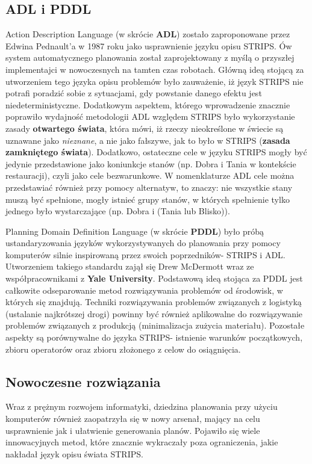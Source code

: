     \subsection{ADL i PDDL}
    Action Description Language (w skrócie \textbf{ADL}) zostało zaproponowane przez Edwina Pednault'a  w 1987 roku jako usprawnienie 
    języku opisu STRIPS. Ów system automatycznego planowania został zaprojektowany z myślą o przyszłej implementajci w nowoczesnych na tamten czas robotach.
    Główną ideą stojącą za utworzeniem tego języka opisu problemów było zauważenie, iż język STRIPS nie potrafi poradzić sobie z sytuacjami, gdy
    powstanie danego efektu jest niedeterministyczne. Dodatkowym aspektem, którego wprowadzenie znacznie poprawiło wydajność metodologii ADL względem STRIPS 
    było wykorzystanie zasady \textbf{otwartego świata}, która mówi, iż rzeczy nieokreślone w świecie są uznawane jako \textit{nieznane}, a nie jako 
    fałszywe, jak to było w STRIPS (\textbf{zasada zamkniętego świata}). Dodatkowo, ostateczne cele w języku STRIPS mogły być jedynie przedstawione jako 
    koniunkcje stanów (np. Dobra i Tania w kontekście restauracji), czyli jako cele bezwarunkowe. 
    W nomenklaturze ADL cele można przedstawiać również przy pomocy alternatyw, to znaczy: 
    nie wszystkie stany muszą być spełnione, mogły istnieć grupy stanów, w których spełnienie tylko jednego było wystarczające (np. Dobra i (Tania lub Blisko)). 

    Planning Domain Definition Language (w skrócie \textbf{PDDL}) było próbą ustandaryzowania języków wykorzystywanych 
    do planowania przy pomocy komputerów silnie inspirowaną przez swoich poprzedników- STRIPS i ADL. 
    Utworzeniem takiego standardu zajął się Drew McDermott wraz ze współpracownikami z \textbf{Yale University}.
    Podstawową ideą stojąca za PDDL jest całkowite odseparowanie metod rozwiązywania problemów od środowisk, w których się 
    znajdują. Techniki rozwiązywania problemów związanych z logistyką (ustalanie najkrótszej drogi) powinny być również aplikowalne do rozwiązywanie problemów 
    związanych z produkcją (minimalizacja zużycia materiału). Pozostałe aspekty są porównywalne do języka STRIPS- 
    istnienie warunków początkowych, zbioru operatorów oraz zbioru złożonego z celow do osiągnięcia.



    \subsection{Nowoczesne rozwiązania}
    Wraz z prężnym rozwojem informatyki, dziedzina planowania przy użyciu komputerów również zaopatrzyła się 
    w nowy arsenał, mający na celu usprawnienie jak i ułatwienie generowania planów.
    Pojawiło się wiele innowacyjnych metod, które znacznie wykraczały poza ograniczenia, jakie 
    nakładał język opisu świata STRIPS.
    
